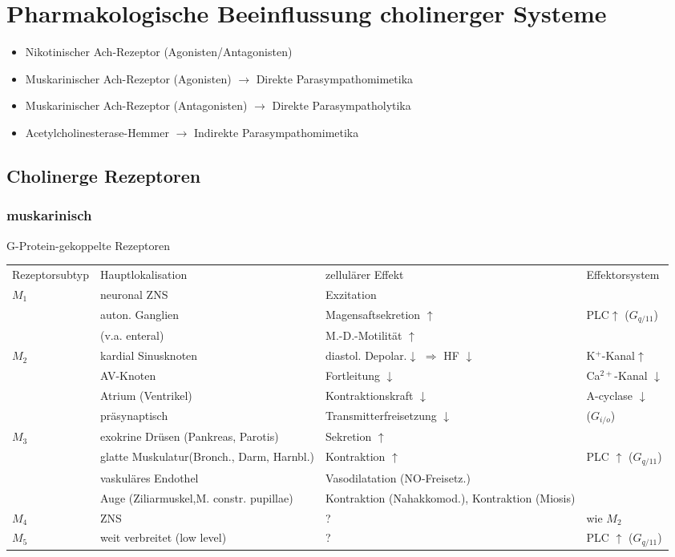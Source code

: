 \documentclass[10pt,a4paper]{report}
\begin{document}
\section{Pharmakologische Beeinflussung cholinerger Systeme}
\begin{itemize}
	\item Nikotinischer Ach-Rezeptor (Agonisten/Antagonisten)
	\item Muskarinischer Ach-Rezeptor (Agonisten) $\rightarrow$ Direkte Parasympathomimetika
 	\item Muskarinischer Ach-Rezeptor (Antagonisten) 
   $\rightarrow$ Direkte Parasympatholytika
	\item Acetylcholinesterase-Hemmer 
   $\rightarrow$ Indirekte Parasympathomimetika
\end{itemize}
\subsection{Cholinerge Rezeptoren}
\subsubsection{muskarinisch}
G-Protein-gekoppelte Rezeptoren\mbox{} \\
\begin{tabularx}{\textwidth}{XXXX}
Rezeptorsubtyp&Hauptlokalisation&zellulärer Effekt&Effektorsystem\\
$M_1$&neuronal ZNS&Exzitation &\\
&auton. Ganglien&Magensaftsekretion $\uparrow$&PLC$\uparrow$ ($G_{q/11}$)\\
&(v.a. enteral)&M.-D.-Motilität $\uparrow$&\\
$M_2$&kardial Sinusknoten&diastol. Depolar.$\downarrow$ $\Rightarrow$ HF $\downarrow$ &K$^+$-Kanal$\uparrow$\\
&AV-Knoten&Fortleitung $\downarrow$&Ca$^{2+}$-Kanal $\downarrow$\\ 
&Atrium (Ventrikel)&Kontraktionskraft $\downarrow$&A-cyclase $\downarrow$\\
&präsynaptisch&Transmitterfreisetzung $\downarrow$&($G_{i/o}$)\\
$M_3$&exokrine Drüsen (Pankreas, Parotis)&Sekretion $\uparrow$&\\
&glatte Muskulatur(Bronch., Darm, Harnbl.)&Kontraktion $\uparrow$&PLC $\uparrow$ ($G_{q/11}$)\\
&vaskuläres Endothel&Vasodilatation (NO-Freisetz.)&\\
&Auge (Ziliarmuskel,M. constr. pupillae)&Kontraktion (Nahakkomod.),  Kontraktion (Miosis)&\\
$M_4$&ZNS&?&wie $M_2$\\
$M_5$&weit verbreitet (low level)&?&PLC $\uparrow$ ($G_{q/11}$)\\
\end{tabularx}
\end{document}
